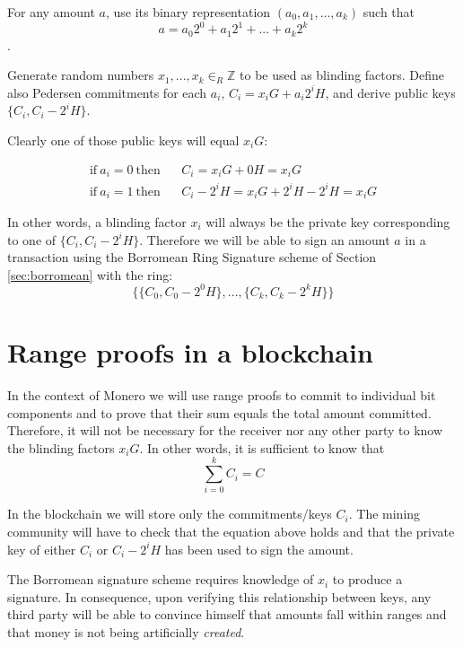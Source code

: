 For any amount \(a\), use its binary representation \((a_0, a_1, ..., a_k)\) such that 
\[a = a_0 2^0 + a_1 2^1 + ... + a_k 2^k  \].

Generate random numbers \(x_1, ..., x_k \in_R \mathbb{Z}\) to be used as blinding factors. 
Define also Pedersen commitments for each \(a_i\), \(C_ i = x_i G + a_i 2^i H\),  and derive public keys \(\{C_i, C_i - 2^i H\}\). 

Clearly one of those public keys will equal \(x_i G\):

\begin{align*}
\textrm{if}\ a_i = 0 \ \textrm{then}\ \ \ &  \ C_i = x_i G + 0 H = x_i G \\
\textrm{if}\ a_i = 1 \ \textrm{then}\ \ \ & \ C_i - 2^i H = x_i G + 2^i H  - 2^i H = x_i G 
\end{align*}

In other words, a blinding factor \(x_i\) will always be the private key corresponding to one of \(\{C_i, C_i - 2^i H\}\).
Therefore we will be able to sign an amount \(a\) in a transaction using the Borromean Ring Signature scheme of 
Section \ref{sec:borromean} with the ring:
\[\{ \{C_0, C_0 - 2^0 H\}, ..., \{C_k, C_k - 2^k H\}  \}\]



\section{Range proofs in a blockchain} 

In the context of Monero we will use range proofs to
commit to individual bit components and to prove that their sum equals the total amount committed. 
Therefore, it will not be necessary for
the receiver nor any other party to know the blinding factors \(x_i G\).
In other words, it is sufficient to know that
\[\sum^k_{i=0} C_i = C  \]

In the blockchain we will store only the commitments/keys \(C_i\). The mining community will have to check that
the equation above holds and that the private key of either \(C_i\) or \(C_i - 2^i H\) has been used to sign the amount.

The Borromean signature scheme requires knowledge of \(x_i\) to produce a signature.
In consequence, upon verifying this relationship between keys, any third party will
be able to convince himself that amounts fall within ranges and that money is not being artificially {\em created}.

